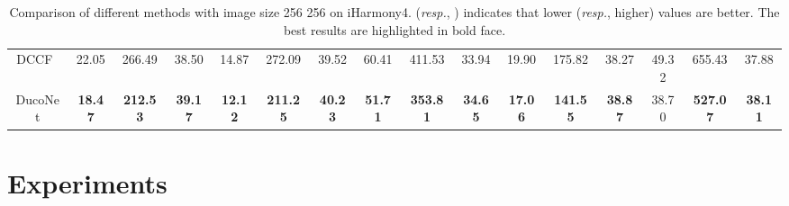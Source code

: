 \documentclass[sigconf]{acmart}
\begin{document}
\begin{table*}[t]
{\begin{tabular}{c|ccc|ccc|ccc|ccc|ccc}
        DCCF~\cite{DCCF} & 22.05  & 266.49  & 38.50  & 14.87  & 272.09  & 39.52  & 60.41  & 411.53  & 33.94  & 19.90  & 175.82  & 38.27  & 49.32  & 655.43  & 37.88   \\ 
        \cline{1-16}
        DucoNet & \textbf{18.47} & \textbf{212.53} & \textbf{39.17} & \textbf{12.12} & \textbf{211.25} & \textbf{40.23} & \textbf{51.71} & \textbf{353.81} & \textbf{34.65} & \textbf{17.06} & \textbf{141.55} & \textbf{38.87} & 38.70 & \textbf{527.07} & \textbf{38.11} \\
    \bottomrule
    \end{tabular}}
    \caption{Comparison of different methods with image size 256  256 on iHarmony4.  (\emph{resp.}, ) indicates that lower (\emph{resp.}, higher) values are better. The best results are highlighted in bold face. }
    \label{table:1}
\end{table*}

\begin{table}[t]
    \centering
    \setlength\tabcolsep{7.8pt}
    \caption{Comparison of different methods with image size  on HAdobe5k.  (\emph{resp.}, ) indicates that lower (\emph{resp.}, higher) values are better. The best results are denoted in bold face.}
    \label{table:2}
\end{table}



\section{Experiments}
\end{document}
